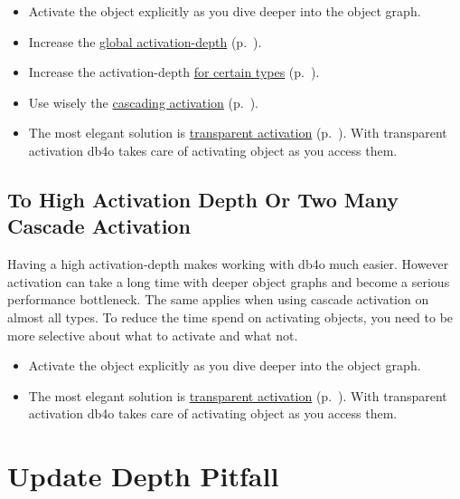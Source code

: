 \begin{itemize}
\item Activate the object explicitly as you dive deeper into the object graph.
\item Increase the \hyperref[ref:configuration-common-activation-depth]{global activation-depth} (p.~\pageref{ref:configuration-common-activation-depth}).
\item Increase the activation-depth \hyperref[ref:configuration-objectclass-minimum-activation-depth]{for certain types} (p.~\pageref{ref:configuration-objectclass-minimum-activation-depth}).
\item Use wisely the \hyperref[ref:configuration-objectclass-cascade-on-activate]{cascading activation} (p.~\pageref{ref:configuration-objectclass-cascade-on-activate}).
\item The most elegant solution is \hyperref[ref:basics-activation-concept-transparent-activation-framework]{transparent activation} (p.~\pageref{ref:basics-activation-concept-transparent-activation-framework}). With transparent activation db4o takes care of activating object as you access them.
\end{itemize}

\subsection*{To High Activation Depth Or Two Many Cascade Activation}

Having a high activation-depth makes working with db4o much easier. However activation can take a long time with deeper object graphs and become a serious performance bottleneck. The same applies when using cascade activation on almost all types. To reduce the time spend on activating objects, you need to be more selective about what to activate and what not.

\begin{itemize}
\item Activate the object explicitly as you dive deeper into the object graph.
\item The most elegant solution is \hyperref[ref:basics-activation-concept-transparent-activation-framework]{transparent activation} (p.~\pageref{ref:basics-activation-concept-transparent-activation-framework}). With transparent activation db4o takes care of activating object as you access them.
\end{itemize}

\section{Update Depth Pitfall}
\label{ref:usage-pitfalls-update-depth}

